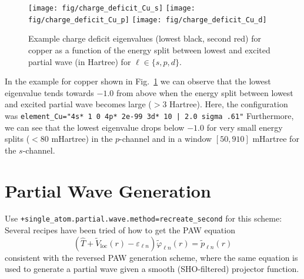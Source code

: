 \documentclass[oribibl]{llncs}
\newcommand{\um}[1]{_{\mathrm{#1}}}
\newcommand{\ttt}[1]{\texttt{#1}}
\begin{document}
\begin{figure} [ht]
  \centering
  \begin{minipage}[c]{.990\textwidth}
	\texttt{[image: fig/charge\_deficit\_Cu\_s]} %
	\texttt{[image: fig/charge\_deficit\_Cu\_p]} %
	\texttt{[image: fig/charge\_deficit\_Cu\_d]} %
  \end{minipage}\hfill
  \begin{minipage}[c]{.009\textwidth}
  \end{minipage}
  \caption{Example charge deficit eigenvalues (lowest black, second red) for copper as a function of the energy split between lowest and excited partial wave (in Hartree) for $\ell \in \{s, p, d\}$.} \label{fig:charge-deficit-copper}
\end{figure}

In the example for copper shown in Fig.~\ref{fig:charge-deficit-copper} 
we can observe that the lowest eigenvalue tends towards $-1.0$ from above
when the energy split between lowest and excited partial wave becomes large ($> 3$ Hartree).
Here, the configuration was
\verb+element_Cu="4s* 1 0 4p* 2e-99 3d* 10 | 2.0 sigma .61"+
Furthermore, we can see that the lowest eigenvalue drops below $-1.0$ for very small energy splits ($< 80$ mHartree) in the $p$-channel
and in a window $[50, 910]$ mHartree for the $s$-channel.


\newpage

\section*{Partial Wave Generation}


Use \ttt{+single\_atom.partial.wave.method=recreate\_second} for this scheme:\\
Several recipes have been tried of how to get the PAW equation
$$ \left( \hat T + \tilde V\um{loc}(r) - \varepsilon_{\ell n} \right) \tilde\varphi_{\ell n}(r) = \tilde p_{\ell n}(r) $$
consistent with the reversed PAW generation scheme, where the same equation is used to generate a partial wave given a
smooth (SHO-filtered) projector function.
\end{document}
